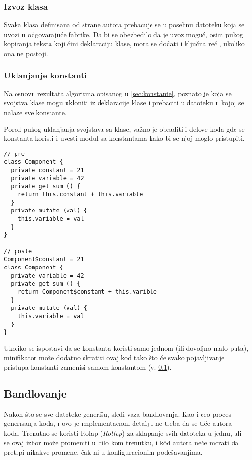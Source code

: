 \subsubsection{Izvoz klasa}

Svaka klasa definisana od strane autora prebacuje se u posebnu datoteku koja se uvozi u odgovarajuće fabrike.
Da bi se obezbedilo da je uvoz moguć, osim pukog kopiranja teksta koji čini deklaraciju klase, mora se dodati i ključna reč , ukoliko ona ne postoji.

\subsubsection{Uklanjanje konstanti}
\label{subsec:uklanjanje-konstanti}

Na osnovu rezultata algoritma opisanog u \cref{sec:konstante}, poznato je koja se svojstva klase mogu ukloniti iz deklaracije klase i prebaciti u datoteku u kojoj se nalaze sve konstante.

Pored pukog uklanjanja svojstava sa klase, važno je obraditi i delove koda gde se konstanta koristi i uvesti modul sa konstantama kako bi se njoj moglo pristupiti.

\begin{lstlisting}
// pre 
class Component {
  private constant = 21
  private variable = 42
  private get sum () {
    return this.constant + this.variable
  }
  private mutate (val) {
    this.variable = val
  }
}

// posle
Component$constant = 21
class Component {
  private variable = 42
  private get sum () {
    return Component$constant + this.varible
  }
  private mutate (val) {
    this.variable = val
  }
}
\end{lstlisting}

Ukoliko se ispostavi da se konstanta koristi samo jednom (ili dovoljno malo puta), minifikator može dodatno skratiti ovaj kod tako što će svako pojavljivanje pristupa konstanti zamenisi samom konstantom (v. \cref{subsec:bandlovanje}).

\subsection{Bandlovanje}\label{subsec:bandlovanje}

Nakon što se sve datoteke generišu, sledi vaza bandlovanja.
Kao i ceo proces generisanja koda, i ovo je implementacioni detalj i ne treba da se tiče autora koda.
Trenutno se koristi Rolap (\textsl{Rollup}) za sklapanje svih datoteka u jednu, ali se ovaj izbor može promeniti u bilo kom trenutku, i k\^od autor\=a neće morati da pretrpi nikakve promene, čak ni u konfiguracionim podešavanjima.

